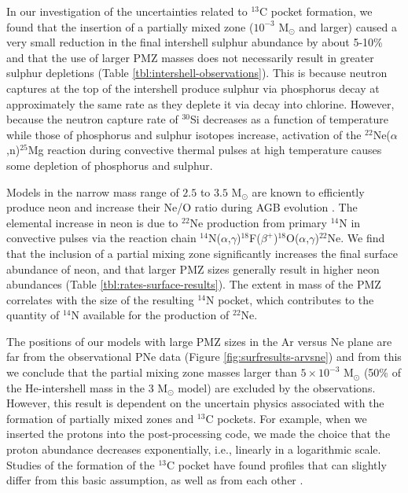 In our investigation of the uncertainties related to $^{13}$C pocket formation, we found that the insertion of a partially mixed zone ($10^{-3}$ M$_\odot$ and larger) caused a very small reduction in the final intershell sulphur abundance by about 5-10\% and that the use of larger PMZ masses does not necessarily result in greater sulphur depletions (Table \ref{tbl:intershell-observations}). This is because neutron captures at the top of the intershell produce sulphur via phosphorus decay at approximately the same rate as they deplete it via decay into chlorine. However, because the neutron capture rate of $^{30}$Si decreases as a function of temperature while those of phosphorus and sulphur isotopes increase, activation of the $^{22}$Ne($\alpha$,n)$^{25}$Mg reaction during convective thermal pulses at high temperature causes some depletion of phosphorus and sulphur.

Models in the narrow mass range of $2.5$ to $3.5$ M$_\odot$ are known
to efficiently produce neon and increase their Ne/O ratio during AGB
evolution \citep{Karakas:2003dj}. The elemental increase in neon
is due to $^{22}$Ne production from primary $^{14}$N in
convective pulses via the reaction chain
$^{14}$N($\alpha$,$\gamma$)$^{18}$F($\beta^+$)$^{18}$O($\alpha$,$\gamma$)$^{22}$Ne.
We find that the inclusion of a partial mixing zone significantly
increases the final surface abundance of neon, 
and that larger PMZ sizes generally result in higher neon abundances (Table
\ref{tbl:rates-surface-results}). The extent in mass of the PMZ correlates with
the size of the resulting $^{14}$N pocket, which contributes to the
quantity of $^{14}$N available for the production of $^{22}$Ne.

The positions of our models with large PMZ sizes in the Ar versus Ne plane are far from the observational PNe data (Figure \ref{fig:surfresults-arvsne}) and from this we conclude that the partial mixing zone masses larger than $5 \times 10^{-3}$ M$_\odot$ (50\% of the He-intershell mass in the 3 M$_\odot$ model) are excluded by the observations.
However, this result is dependent on the uncertain physics associated
with the formation of partially mixed zones and $^{13}$C pockets. For
example, when we inserted the protons into the post-processing code, we
made the choice that the proton abundance decreases exponentially, i.e., linearly in a logarithmic scale. 
Studies of the formation of the $^{13}$C pocket have found profiles that can slightly differ from 
this basic assumption, as well as from each other \citep[e.g., see discussion in][]{Lugaro:2012ht}.

